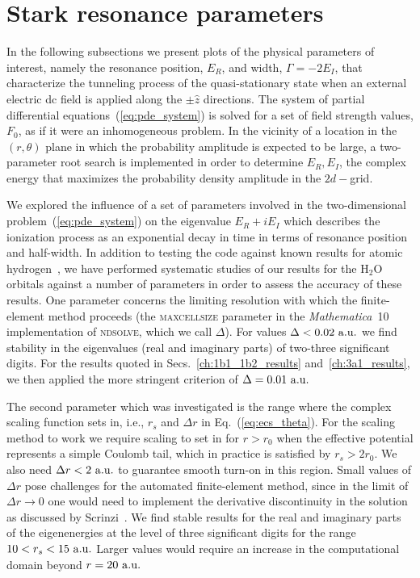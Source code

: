 \section{Stark resonance parameters}
\label{ch:stark_params}

In the following subsections we present plots of the physical
parameters of interest, namely the resonance position, $E_{R}$, and
width, $\Gamma = -2E_{I}$, that characterize the tunneling process of
the quasi-stationary state when an external electric dc field is
applied along the $\pm\hat{z}$ directions. The system of partial
differential equations~(\ref{eq:pde_system}) is solved for a set of
field strength values, $F_{0}$, as if it were an inhomogeneous
problem. In the vicinity of a location in the $(r,\theta)$ plane in
which the probability amplitude is expected to be large, a
two-parameter root search is implemented in order to determine
${E_{R}, E_{I}}$, the complex energy that maximizes the probability
density amplitude in the $2d-$grid.

We explored the influence of a set of parameters involved in the
two-dimensional problem~(\ref{eq:pde_system}) on the eigenvalue
$E_{R}+iE_{I}$ which describes the ionization process as an
exponential decay in time in terms of resonance position and
half-width. In addition to testing the code against known results for
atomic hydrogen~\cite{Telnov_1989}, we have performed systematic
studies of our results for the H$_{2}$O orbitals against a number of
parameters in order to assess the accuracy of these results. One
parameter concerns the limiting resolution with which the
finite-element method proceeds (the \textsc{maxcellsize} parameter in
the \emph{Mathematica}~10 implementation of \textsc{ndsolve}, which we
call $\Delta$). For values $\Delta<0.02\ \rm{a.u.}$ we find stability
in the eigenvalues (real and imaginary parts) of two-three significant
digits. For the results quoted in Secs.~\ref{ch:1b1_1b2_results}
and~\ref{ch:3a1_results}, we then applied the more stringent criterion
of $\Delta=0.01\ \rm{a.u.}$

The second parameter which was investigated is the range where the
complex scaling function sets in, i.e., $r_{s}$ and $\Delta r$ in
Eq.~(\ref{eq:ecs_theta}). For the scaling method to work we require
scaling to set in for $r > r_0$ when the effective potential represents
a simple Coulomb tail, which in practice is satisfied by
$r_{s} > 2r_{0}$. We also need $\Delta r < 2\ \rm{a.u.}$ to guarantee
smooth turn-on in this region. Small values of $\Delta r$ pose
challenges for the automated finite-element method, since in the limit
of $\Delta r \to 0$ one would need to implement the derivative
discontinuity in the solution as discussed by
Scrinzi~\cite{ecsScrinzi}. We find stable results for the real and
imaginary parts of the eigenenergies at the level of three significant
digits for the range $10 < r_{s} < 15\ \rm{a.u.}$ Larger values would
require an increase in the computational domain beyond
$r=20\ \rm{a.u.}$

